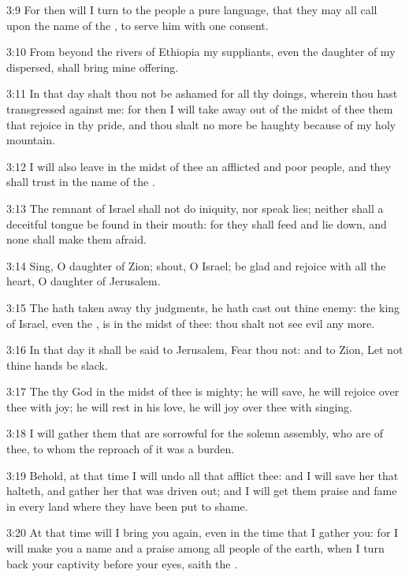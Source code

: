 3:9 For then will I turn to the people a pure language, that they may
all call upon the name of the \LORD, to serve him with one consent.

3:10 From beyond the rivers of Ethiopia my suppliants, even the
daughter of my dispersed, shall bring mine offering.

3:11 In that day shalt thou not be ashamed for all thy doings, wherein
thou hast transgressed against me: for then I will take away out of
the midst of thee them that rejoice in thy pride, and thou shalt no
more be haughty because of my holy mountain.

3:12 I will also leave in the midst of thee an afflicted and poor
people, and they shall trust in the name of the \LORD.

3:13 The remnant of Israel shall not do iniquity, nor speak lies;
neither shall a deceitful tongue be found in their mouth: for they
shall feed and lie down, and none shall make them afraid.

3:14 Sing, O daughter of Zion; shout, O Israel; be glad and rejoice
with all the heart, O daughter of Jerusalem.

3:15 The \LORD hath taken away thy judgments, he hath cast out thine
enemy: the king of Israel, even the \LORD, is in the midst of thee:
thou shalt not see evil any more.

3:16 In that day it shall be said to Jerusalem, Fear thou not: and to
Zion, Let not thine hands be slack.

3:17 The \LORD thy God in the midst of thee is mighty; he will save, he
will rejoice over thee with joy; he will rest in his love, he will joy
over thee with singing.

3:18 I will gather them that are sorrowful for the solemn assembly,
who are of thee, to whom the reproach of it was a burden.

3:19 Behold, at that time I will undo all that afflict thee: and I
will save her that halteth, and gather her that was driven out; and I
will get them praise and fame in every land where they have been put
to shame.

3:20 At that time will I bring you again, even in the time that I
gather you: for I will make you a name and a praise among all people
of the earth, when I turn back your captivity before your eyes,
saith the \LORD.


